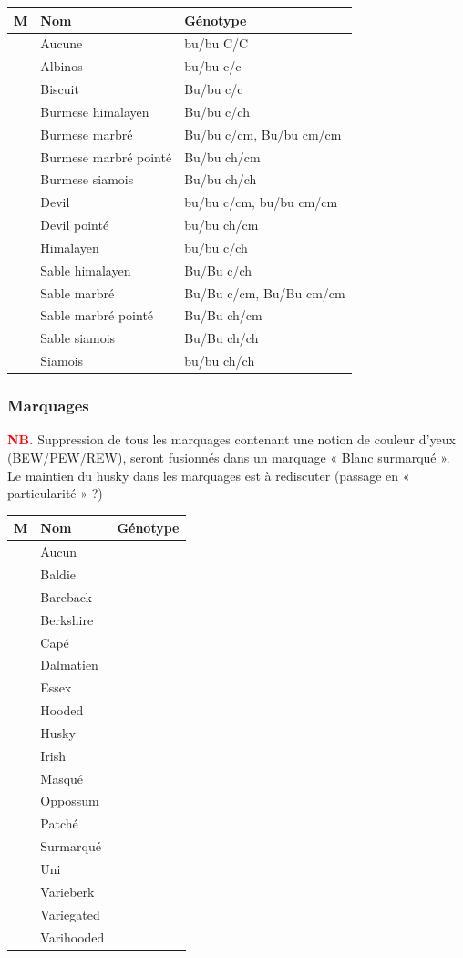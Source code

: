 \documentclass[a4paper,10pt]{article}
\newcommand\desire[1]{\noindent\textbf{\textcolor{red}{#1}}}
\begin{document}
\begin{longtable}{|c|l|l|}\hline
\textbf{M} & \textbf{Nom} & \textbf{Génotype} \\\hline
 &  Aucune & bu/bu C/C \\\hline
 &  Albinos & bu/bu c/c \\\hline
 &  Biscuit & Bu/bu c/c \\\hline
 &  Burmese himalayen & Bu/bu c/ch \\\hline
 &  Burmese marbré & Bu/bu c/cm, Bu/bu cm/cm  \\\hline
 &  Burmese marbré pointé & Bu/bu ch/cm \\\hline
 &  Burmese siamois & Bu/bu ch/ch \\\hline
 &  Devil & bu/bu c/cm, bu/bu cm/cm \\\hline
 &  Devil pointé & bu/bu ch/cm \\\hline
 &  Himalayen & bu/bu c/ch \\\hline
 &  Sable himalayen & Bu/Bu c/ch \\\hline
 &  Sable marbré & Bu/Bu c/cm, Bu/Bu cm/cm \\\hline
 &  Sable marbré pointé & Bu/Bu ch/cm \\\hline
 &  Sable siamois & Bu/Bu ch/ch \\\hline
 &  Siamois & bu/bu ch/ch \\\hline
\end{longtable}

\subsubsection{Marquages}
\desire{NB.} Suppression de tous les marquages contenant une notion de couleur d’yeux (BEW/PEW/REW), seront fusionnés dans un marquage « Blanc surmarqué ». Le maintien du husky dans les marquages est à rediscuter (passage en « particularité » ?)  

\begin{longtable}{|c|l|l|}\hline
\textbf{M} & \textbf{Nom} & \textbf{Génotype} \\\hline
\endhead
 &  Aucun & \\\hline
 &  Baldie & \\\hline
 &  Bareback & \\\hline
 &  Berkshire & \\\hline
 &  Capé & \\\hline
 &  Dalmatien & \\\hline
 &  Essex & \\\hline
 &  Hooded & \\\hline
 &  Husky & \\\hline
 &  Irish & \\\hline
 &  Masqué & \\\hline
 &  Oppossum & \\\hline
 &  Patché & \\\hline
 &  Surmarqué & \\\hline
 &  Uni & \\\hline
 &  Varieberk & \\\hline
 &  Variegated & \\\hline
 &  Varihooded & \\\hline
\end{longtable}
\end{document}
